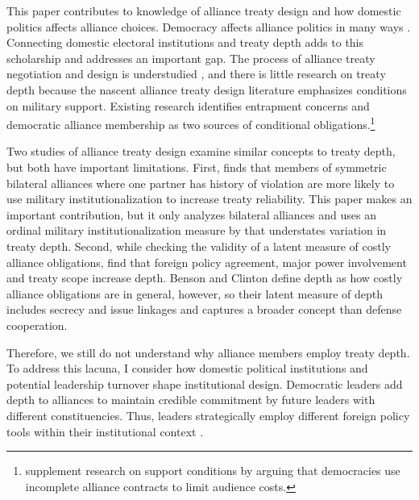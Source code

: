 \documentclass[12pt]{article}
\begin{document}
This paper contributes to knowledge of alliance treaty design and how domestic politics affects alliance choices.
Democracy affects alliance politics in many ways \citep{LaiReiter2000, GiblerWolford2006, Mattes2012a, Warren2016, McManusYarhi-Milo2017}. 
Connecting domestic electoral institutions and treaty depth adds to this scholarship and addresses an important gap.
The process of alliance treaty negotiation and design is understudied \citep{Poast2019a}, and there is little research on treaty depth because the nascent alliance treaty design literature emphasizes conditions on military support.
Existing research identifies entrapment concerns \citep{Kim2011, Benson2012} and democratic alliance membership \citep{Mattes2012, Chibaetal2015} as two sources of conditional obligations.\footnote{\citet{FjelstulReiter2019} supplement research on support conditions by arguing that democracies use incomplete alliance contracts to limit audience costs.} 


Two studies of alliance treaty design examine similar concepts to treaty depth, but both have important limitations.   
First, \citet{Mattes2012} finds that members of symmetric bilateral alliances where one partner has history of violation are more likely to use military institutionalization to increase treaty reliability. 
This paper makes an important contribution, but it only analyzes bilateral alliances and uses an ordinal military institutionalization measure by \citet{LeedsAnac2005} that understates variation in treaty depth.  
Second, while checking the validity of a latent measure of costly alliance obligations, \citet{BensonClinton2016} find that foreign policy agreement, major power involvement and treaty scope increase depth. 
Benson and Clinton define depth as how costly alliance obligations are in general, however, so their latent measure of depth includes secrecy and issue linkages and captures a broader concept than defense cooperation. 


Therefore, we still do not understand why alliance members employ treaty depth.
To address this lacuna, I consider how domestic political institutions and potential leadership turnover shape institutional design.
Democratic leaders add depth to alliances to maintain credible commitment by future leaders with different constituencies.  
Thus, leaders strategically employ different foreign policy tools within their institutional context \citep{HydeSaunders2020}. 
\end{document}
